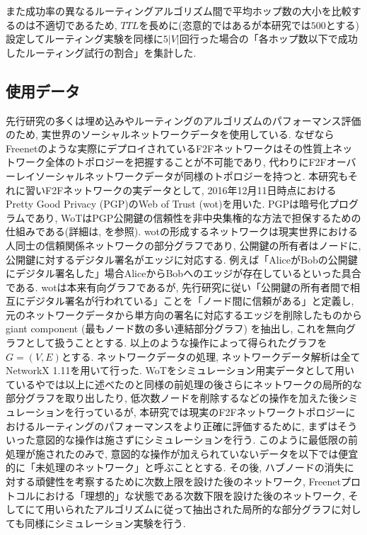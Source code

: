 \documentclass[dvipdfmx]{ampbt}
\begin{document}
  また成功率の異なるルーティングアルゴリズム間で平均ホップ数の大小を比較するのは不適切であるため, $TTL$を長めに(恣意的ではあるが本研究では$500$とする)設定してルーティング実験を同様に$5|V|$回行った場合の「各ホップ数以下で成功したルーティング試行の割合」を集計した.

  \subsection{使用データ} \label{sec:wot}
  先行研究の多くは埋め込みやルーティングのアルゴリズムのパフォーマンス評価のため, 実世界のソーシャルネットワークデータを使用している. なぜならFreenetのような実際にデプロイされているF2Fネットワークはその性質上ネットワーク全体のトポロジーを把握することが不可能であり, 代わりにF2Fオーバーレイソーシャルネットワークデータが同様のトポロジーを持つと. 本研究もそれに習いF2Fネットワークの実データとして, 2016年12月11日時点におけるPretty Good Privacy (PGP)のWeb of Trust (\acrshort{wot})を用いた. PGPは暗号化プログラムであり, WoTはPGP公開鍵の信頼性を非中央集権的な方法で担保するための仕組みである(詳細は\cite{zimmermann1995official}, \cite{abdul1998distributed}を参照). \acrshort{wot}の形成するネットワークは現実世界における人同士の信頼関係ネットワークの部分グラフであり, 公開鍵の所有者はノードに, 公開鍵に対するデジタル署名がエッジに対応する. 例えば「AliceがBobの公開鍵にデジタル署名した」場合AliceからBobへのエッジが存在しているといった具合である. \acrshort{wot}は本来有向グラフであるが, 先行研究に従い「公開鍵の所有者間で相互にデジタル署名が行われている」ことを「ノード間に信頼がある」と定義し, 元のネットワークデータから単方向の署名に対応するエッジを削除したものからgiant component (最もノード数の多い連結部分グラフ) を抽出し, これを無向グラフとして扱うこととする. 以上のような操作によって得られたグラフを$G=(V,E)$とする. ネットワークデータの処理, ネットワークデータ解析は全てNetworkX 1.11\cite{hagberg2008exploring}を用いて行った. \newline
 WoTをシミュレーション用実データとして用いている\cite{sandberg2006distributed}や\cite{clarke2010private}では以上に述べたのと同様の前処理の後さらにネットワークの局所的な部分グラフを取り出したり, 低次数ノードを削除するなどの操作を加えた後シミュレーションを行っているが, 本研究では現実のF2Fネットワークトポロジーにおけるルーティングのパフォーマンスをより正確に評価するために, まずはそういった意図的な操作は施さずにシミュレーションを行う. このように最低限の前処理が施されたのみで, 意図的な操作が加えられていないデータを以下では便宜的に「未処理のネットワーク」と呼ぶこととする. その後, ハブノードの消失に対する頑健性を考察するために次数上限を設けた後のネットワーク, Freenetプロトコルにおける「理想的」な状態である次数下限を設けた後のネットワーク, そして\cite{sandberg2006distributed}にて用いられたアルゴリズムに従って抽出された局所的な部分グラフに対しても同様にシミュレーション実験を行う. \newline
\end{document}
